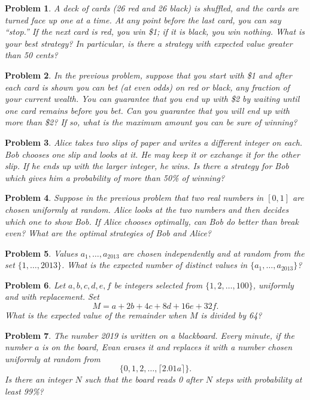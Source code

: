 \documentclass[12pt]{article}
\newtheorem{problem}{Problem}
\begin{document}
\begin{problem}
A deck of cards (26 red and 26 black) is shuffled, and the cards are turned face up one at a
time. At any point before the last card, you can say ``stop.'' If the next card is red, you win \$1;
if it is black, you win nothing. What is your best strategy? In particular, is there a strategy
with expected value greater than 50 cents?
\end{problem}

\begin{problem}
In the previous problem, suppose that you start with \$1 and after each card is shown you can
bet (at even odds) on red or black, any fraction of your current wealth. You can guarantee
that you end up with \$2 by waiting until one card remains before you bet. Can you guarantee
that you will end up with more than \$2? If so, what is the maximum amount you can be sure
of winning?
\end{problem}

\begin{problem}
Alice takes two slips of paper and writes a different integer on each. Bob chooses one slip
and looks at it. He may keep it or exchange it for the other slip. If he ends up with the larger
integer, he wins. Is there a strategy for Bob which gives him a probability of more than 50\%
of winning?
\end{problem}

\begin{problem}
Suppose in the previous problem that two real numbers in $[0,1]$ are chosen uniformly at random.
Alice looks at the two numbers and then decides which one to show Bob. If Alice chooses
optimally, can Bob do better than break even? What are the optimal strategies of Bob and Alice?
\end{problem}

\begin{problem}
Values $a_1, \dots, a_{2013}$ are chosen independently and at random from the set $\{1,\dots,2013\}$. What
is the expected number of distinct values in $\{a_1,\dots,a_{2013}\}$?
\end{problem}

\begin{problem}
Let $a,b,c,d,e,f$ be integers selected from $\{1,2,\dots,100\}$, uniformly and with replacement. Set
\[
M = a + 2b + 4c + 8d + 16e + 32f.
\]
What is the expected value of the remainder when $M$ is divided by 64?
\end{problem}

\begin{problem}
The number 2019 is written on a blackboard. Every minute, if the number $a$ is on the board,
Evan erases it and replaces it with a number chosen uniformly at random from
\[
\{0,1,2,\dots,\lceil 2.01a \rceil\}.
\]
Is there an integer $N$ such that the board reads 0 after $N$ steps with probability at least 99\%?
\end{problem}
\end{document}
